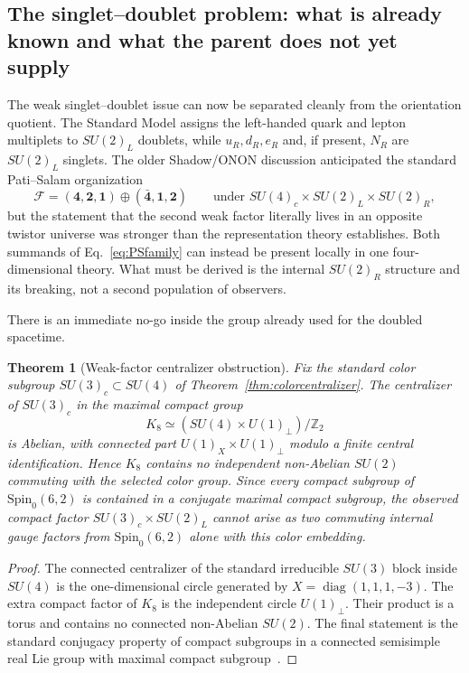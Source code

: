 \documentclass[11pt]{article}
\newtheorem{theorem}{Theorem}[section]
\theoremstyle{definition}\newtheorem{definition}[theorem]{Definition}
\theoremstyle{remark}\newtheorem{remark}[theorem]{Remark}\newtheorem{conjecture}[theorem]{Conjecture}
\begin{document}
\subsection{The singlet--doublet problem: what is already known and what the parent does not yet supply}\label{subsec:singletdoublet}
The weak singlet--doublet issue can now be separated cleanly from the orientation quotient. The Standard Model assigns the left-handed quark and lepton multiplets to $SU(2)_L$ doublets, while $u_R,d_R,e_R$ and, if present, $N_R$ are $SU(2)_L$ singlets. The older Shadow/ONON discussion anticipated the standard Pati--Salam organization
\begin{equation}\label{eq:PSfamily}
 \mathcal F=(\mathbf4,\mathbf2,\mathbf1)\oplus(\bar{\mathbf4},\mathbf1,\mathbf2)
 \qquad
 \text{under }SU(4)_c\times SU(2)_L\times SU(2)_R,
\end{equation}
but the statement that the second weak factor literally lives in an opposite twistor universe was stronger than the representation theory establishes. Both summands of Eq.~\eqref{eq:PSfamily} can instead be present locally in one four-dimensional theory. What must be derived is the internal $SU(2)_R$ structure and its breaking, not a second population of observers.

There is an immediate no-go inside the group already used for the doubled spacetime.
\begin{theorem}[Weak-factor centralizer obstruction]\label{thm:weakcentralizerno}
Fix the standard color subgroup $SU(3)_c\subset SU(4)$ of Theorem~\ref{thm:colorcentralizer}. The centralizer of $SU(3)_c$ in the maximal compact group
\begin{equation}
 K_8\simeq (SU(4)\times U(1)_\perp)/\mathbb Z_2
\end{equation}
is Abelian, with connected part $U(1)_X\times U(1)_\perp$ modulo a finite central identification. Hence $K_8$ contains no independent non-Abelian $SU(2)$ commuting with the selected color group. Since every compact subgroup of $\mathrm{Spin}_0(6,2)$ is contained in a conjugate maximal compact subgroup, the observed compact factor $SU(3)_c\times SU(2)_L$ cannot arise as two commuting internal gauge factors from $\mathrm{Spin}_0(6,2)$ alone with this color embedding.
\end{theorem}
\begin{proof}
The connected centralizer of the standard irreducible $SU(3)$ block inside $SU(4)$ is the one-dimensional circle generated by $X=\operatorname{diag}(1,1,1,-3)$. The extra compact factor of $K_8$ is the independent circle $U(1)_\perp$. Their product is a torus and contains no connected non-Abelian $SU(2)$. The final statement is the standard conjugacy property of compact subgroups in a connected semisimple real Lie group with maximal compact subgroup~\cite{Helgason1978}.
\end{proof}
\end{document}

